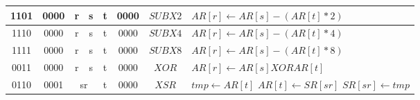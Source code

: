 \begin{longtable}{llllllllllllllllllllllll  p{1cm}  p{6cm} | }
		\multicolumn{4}{|c|}{1101} & \multicolumn{4}{c|}{0000} & \multicolumn{4}{c|}{r} & \multicolumn{4}{c|}{s} & \multicolumn{4}{c|}{t} & \multicolumn{4}{c|}{0000} & \multicolumn{1}{c|}{$SUBX2$} & $AR[r] \leftarrow AR[s] - (AR[t]*2)$ \\ \hline        
		\multicolumn{4}{|c|}{1110} & \multicolumn{4}{c|}{0000} & \multicolumn{4}{c|}{r} & \multicolumn{4}{c|}{s} & \multicolumn{4}{c|}{t} & \multicolumn{4}{c|}{0000} & \multicolumn{1}{c|}{$SUBX4$} & $AR[r] \leftarrow AR[s] - (AR[t]*4)$ \\ \hline        
		\multicolumn{4}{|c|}{1111} & \multicolumn{4}{c|}{0000} & \multicolumn{4}{c|}{r} & \multicolumn{4}{c|}{s} & \multicolumn{4}{c|}{t} & \multicolumn{4}{c|}{0000} & \multicolumn{1}{c|}{$SUBX8$} & $AR[r] \leftarrow AR[s] - (AR[t]*8)$ \\ \hline
		\multicolumn{4}{|c|}{0011} & \multicolumn{4}{c|}{0000} & \multicolumn{4}{c|}{r} & \multicolumn{4}{c|}{s} & \multicolumn{4}{c|}{t} & \multicolumn{4}{c|}{0000} & \multicolumn{1}{c|}{$XOR$} & $AR[r] \leftarrow AR[s] XOR AR[t]$ \\ \hline
		\multicolumn{4}{|c|}{0110} & \multicolumn{4}{c|}{0001} & \multicolumn{8}{c|}{sr} & \multicolumn{4}{c|}{t} & \multicolumn{4}{c|}{0000} & \multicolumn{1}{c|}{$XSR$} & $tmp \leftarrow AR[t]$ \newline $AR[t] \leftarrow SR[sr]$ \newline $SR[sr] \leftarrow tmp$ \\ \hline
	\end{longtable}

